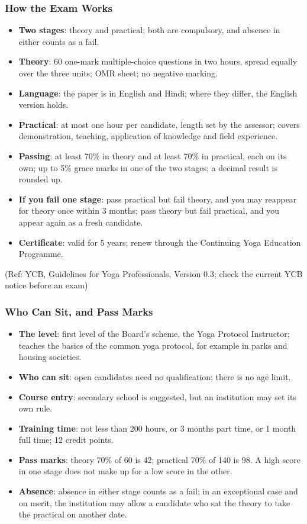 \begin{frame}[fragile]\frametitle{How the Exam Works}
\begin{itemize}
\item \textbf{Two stages}: theory and practical; both are compulsory, and absence in either counts as a fail.
\item \textbf{Theory}: 60 one-mark multiple-choice questions in two hours, spread equally over the three units; OMR sheet; no negative marking.
\item \textbf{Language}: the paper is in English and Hindi; where they differ, the English version holds.
\item \textbf{Practical}: at most one hour per candidate, length set by the assessor; covers demonstration, teaching, application of knowledge and field experience.
\item \textbf{Passing}: at least 70\% in theory and at least 70\% in practical, each on its own; up to 5\% grace marks in one of the two stages; a decimal result is rounded up.
\item \textbf{If you fail one stage}: pass practical but fail theory, and you may reappear for theory once within 3 months; pass theory but fail practical, and you appear again as a fresh candidate.
\item \textbf{Certificate}: valid for 5 years; renew through the Continuing Yoga Education Programme.
\end{itemize}
{\tiny (Ref: YCB, Guidelines for Yoga Professionals, Version 0.3; check the current YCB notice before an exam)}
\end{frame}

\begin{frame}[fragile]\frametitle{Who Can Sit, and Pass Marks}
\begin{itemize}
\item \textbf{The level}: first level of the Board's scheme, the Yoga Protocol Instructor; teaches the basics of the common yoga protocol, for example in parks and housing societies.
\item \textbf{Who can sit}: open candidates need no qualification; there is no age limit.
\item \textbf{Course entry}: secondary school is suggested, but an institution may set its own rule.
\item \textbf{Training time}: not less than 200 hours, or 3 months part time, or 1 month full time; 12 credit points.
\item \textbf{Pass marks}: theory 70\% of 60 is 42; practical 70\% of 140 is 98. A high score in one stage does not make up for a low score in the other.
\item \textbf{Absence}: absence in either stage counts as a fail; in an exceptional case and on merit, the institution may allow a candidate who sat the theory to take the practical on another date.
\end{itemize}
\end{frame}

